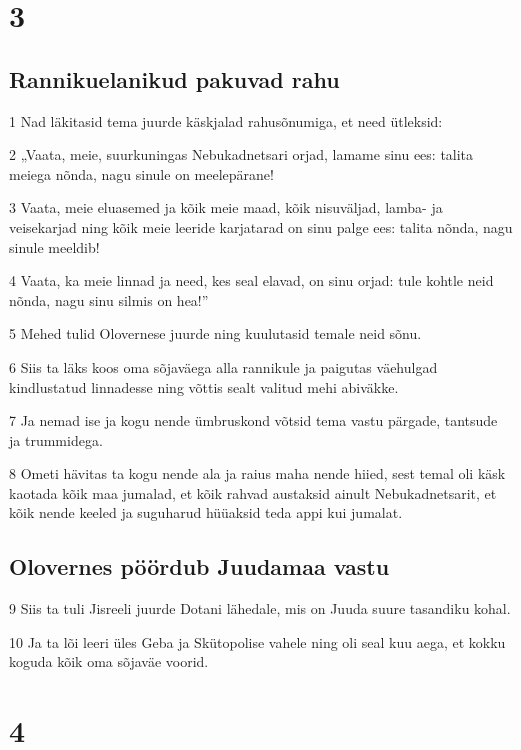 \chapter{3}

\section*{Rannikuelanikud pakuvad rahu}

\par 1 Nad läkitasid tema juurde käskjalad rahusõnumiga, et need ütleksid:
\par 2 „Vaata, meie, suurkuningas Nebukadnetsari orjad, lamame sinu ees: talita meiega nõnda, nagu sinule on meelepärane!
\par 3 Vaata, meie eluasemed ja kõik meie maad, kõik nisuväljad, lamba- ja veisekarjad ning kõik meie leeride karjatarad on sinu palge ees: talita nõnda, nagu sinule meeldib!
\par 4 Vaata, ka meie linnad ja need, kes seal elavad, on sinu orjad: tule kohtle neid nõnda, nagu sinu silmis on hea!”
\par 5 Mehed tulid Olovernese juurde ning kuulutasid temale neid sõnu.
\par 6 Siis ta läks koos oma sõjaväega alla rannikule ja paigutas väehulgad kindlustatud linnadesse ning võttis sealt valitud mehi abiväkke.
\par 7 Ja nemad ise ja kogu nende ümbruskond võtsid tema vastu pärgade, tantsude ja trummidega.
\par 8 Ometi hävitas ta kogu nende ala ja raius maha nende hiied, sest temal oli käsk kaotada kõik maa jumalad, et kõik rahvad austaksid ainult Nebukadnetsarit, et kõik nende keeled ja suguharud hüüaksid teda appi kui jumalat. 

\section*{Olovernes pöördub Juudamaa vastu}

\par 9 Siis ta tuli Jisreeli juurde Dotani lähedale, mis on Juuda suure tasandiku kohal.
\par 10 Ja ta lõi leeri üles Geba ja Skütopolise vahele ning oli seal kuu aega, et kokku koguda kõik oma sõjaväe voorid.


\chapter{4}

